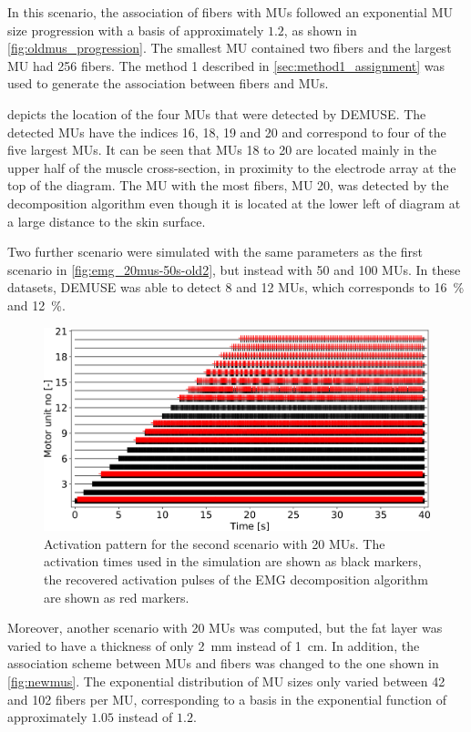 In this scenario, the association of fibers with MUs followed an exponential MU size progression with a basis of approximately $1.2$, as shown in \cref{fig:oldmus_progression}. The smallest MU contained two fibers and the largest MU had 256 fibers. The method 1 described in \cref{sec:method1_assignment} was used to generate the association between fibers and MUs.

 depicts the location of the four MUs that were detected by DEMUSE. The detected MUs have the indices 16, 18, 19 and 20 and correspond to four of the five largest MUs. It can be seen that MUs 18 to 20 are located mainly in the upper half of the muscle cross-section, in proximity to the electrode array at the top of the diagram.
The MU with the most fibers, MU 20, was detected by the decomposition algorithm even though it is located at the lower left of diagram at a large distance to the skin surface.

Two further scenario were simulated with the same parameters as the first scenario in \cref{fig:emg_20mus-50s-old2}, but instead with 50 and 100 MUs. In these datasets, DEMUSE was able to detect 8 and 12 MUs, which corresponds to \SI{16}{\percent} and \SI{12}{\percent}. 

\begin{figure}
  \centering%
  \includegraphics[width=\textwidth]{images/results/application/emg_20mus-40s_new3.png}%
  \caption{Activation pattern for the second scenario with 20 MUs. The activation times used in the simulation are shown as black markers, the recovered activation pulses of the EMG decomposition algorithm are shown as red markers.}%
  \label{fig:emg_20mus-40s_new}%
\end{figure}

Moreover, another scenario with 20 MUs was computed, but the fat layer was varied to have a thickness of only \SI{2}{\mm} instead of \SI{1}{\cm}. In addition, the association scheme between MUs and fibers was changed to the one shown in \cref{fig:newmus}. The exponential distribution of MU sizes only varied between 42 and 102 fibers per MU, corresponding to a basis in the exponential function of approximately $1.05$ instead of $1.2$.

